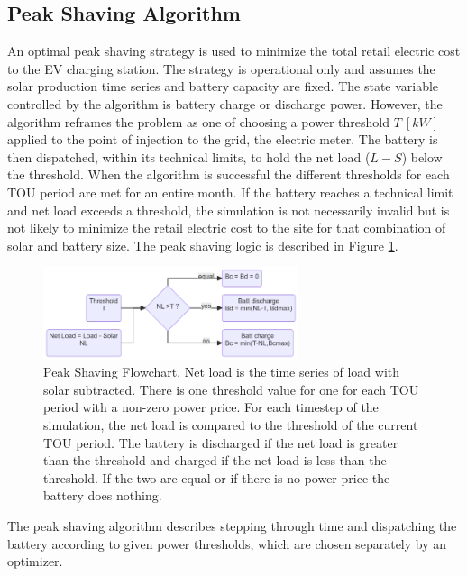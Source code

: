 \documentclass[journal,article,submit,pdftex,moreauthors]{Definitions/mdpi}
\begin{document}
  \subsection{Peak Shaving Algorithm}\label{peak-shaving-algorithm}%

  An optimal peak shaving strategy is used to minimize the total retail electric cost to the EV charging station. The strategy is operational only and assumes the solar production time series and battery capacity are fixed. The state variable controlled by the algorithm is battery charge or discharge power. However, the algorithm reframes the problem as one of choosing a power threshold \(T\ [kW]\) applied to the point of injection to the grid, the electric meter. The battery is then dispatched, within its technical limits, to hold the net load ($L-S$) below the threshold. When the algorithm is successful the different thresholds for each TOU period are met for an entire month. If the battery reaches a technical limit and net load exceeds a threshold, the simulation is not necessarily invalid but is not likely to minimize the retail electric cost to the site for that combination of solar and battery size. The peak shaving logic is described in Figure \ref{fig:peakshaving-flowchart}.

\begin{figure}
  \centering
  \includegraphics[width=7.5cm]{./images/peak shaving flowchart.png}
  \caption{Peak Shaving Flowchart. Net load is the time series of load with solar subtracted. There is one threshold value for one for each TOU period with a non-zero power price. For each timestep of the simulation, the net load is compared to the threshold of the current TOU period. The battery is discharged if the net load is greater than the threshold and charged if the net load is less than the threshold. If the two are equal or if there is no power price the battery does nothing.}
  \label{fig:peakshaving-flowchart}
\end{figure}

The peak shaving algorithm describes stepping through time and dispatching the battery according to given power thresholds, which are chosen separately by an optimizer.
\end{document}
